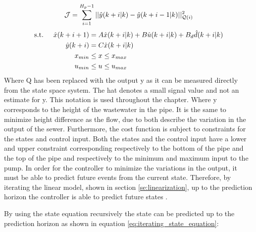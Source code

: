 \begin{equation}\label{eq:cost_function_height}
	 \CMcal{J} = \sum_{i=1}^{H_p-1} || \hat{y}(k+i|k)-\hat{y}(k+i-1|k)||_{\CMcal{Q}(i)}^2
\end{equation}
\begin{equation}\label{eq:state_eq_subject_to}
	\begin{aligned}
	\text{s.t.} \hspace{5mm}  \hat{x}(k+i+1) &= A\hat{x}(k+i|k)+B\hat{u}(k+i|k)+B_d\hat{d}(k+i|k) \\
						      \hat{y}(k+i)&= C\hat{x}(k+i|k) \\
						     x_{min} &\leq  x \leq x_{max} \\
						     u_{min} & \leq u \leq u_{max}
	\end{aligned}
\end{equation}
Where Q has been replaced with the output y as it can be measured directly from the state space system. The hat denotes a small signal value and not an estimate for y. This notation is used throughout the chapter. Where y corresponds to the height of the wastewater in the pipe. It is the same to minimize height difference as the flow, due to both describe the variation in the output of the sewer. Furthermore, the cost function is subject to constraints for the states and control input. Both the states and the control input have a lower and upper constraint corresponding respectively to the bottom of the pipe and the top of the pipe and respectively to the minimum and maximum input to the pump. In order for the controller to minimize the variations in the output, it must be able to predict future events from the current state. Therefore, by iterating the linear model, shown in section \ref{se:linearization}, up to the prediction horizon the controller is able to predict future states \cite{maciejowski2002predictive}.



By using the state equation recursively the state can be predicted up to the prediction horizon as shown in equation \ref{eq:iterating_state_equation}: 

